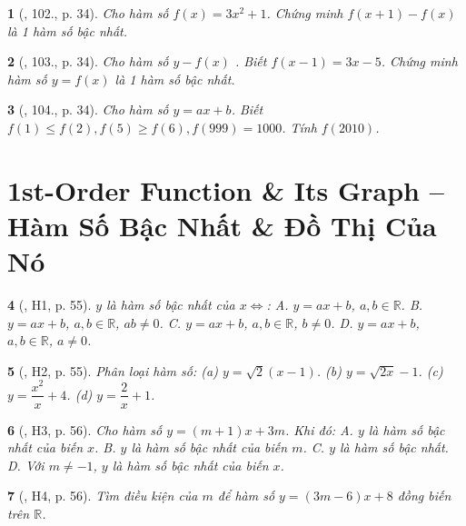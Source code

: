 \documentclass{article}
\newtheorem{baitoan}{}
\begin{document}
\begin{baitoan}[\cite{Tuyen_Toan_9_old}, 102., p. 34]
	Cho hàm số $f(x) = 3x^2 + 1$. Chứng minh $f(x + 1) - f(x)$ là 1 hàm số bậc nhất.
\end{baitoan}

\begin{baitoan}[\cite{Tuyen_Toan_9_old}, 103., p. 34]
	Cho hàm số $y - f(x)$ . Biết $f(x - 1) = 3x - 5$. Chứng minh hàm số $y = f(x)$ là 1 hàm số bậc nhất.
\end{baitoan}

\begin{baitoan}[\cite{Tuyen_Toan_9_old}, 104., p. 34]
	Cho hàm số $y = ax + b$. Biết $f(1)\le f(2),f(5)\ge f(6),f(999) = 1000$. Tính $f(2010)$.
\end{baitoan}


\section{1st-Order Function \& Its Graph -- Hàm Số Bậc Nhất \& Đồ Thị Của Nó}

\begin{baitoan}[\cite{Binh_boi_duong_Toan_9_tap_1}, H1, p. 55]
	$y$ là hàm số bậc nhất của $x\Leftrightarrow$: {\sf A.} $y = ax + b$, $a,b\in\mathbb{R}$. {\sf B.} $y = ax + b$, $a,b\in\mathbb{R}$, $ab\ne0$. {\sf C.} $y = ax + b$, $a,b\in\mathbb{R}$, $b\ne0$. {\sf D.} $y = ax + b$, $a,b\in\mathbb{R}$, $a\ne0$.
\end{baitoan}

\begin{baitoan}[\cite{Binh_boi_duong_Toan_9_tap_1}, H2, p. 55]
	Phân loại hàm số: (a) $y = \sqrt{2}(x - 1)$. (b) $y = \sqrt{2x} - 1$. (c) $y = \dfrac{x^2}{x} + 4$. (d) $y = \dfrac{2}{x} + 1$.
\end{baitoan}

\begin{baitoan}[\cite{Binh_boi_duong_Toan_9_tap_1}, H3, p. 56]
	Cho hàm số $y = (m + 1)x + 3m$. Khi đó: {\sf A.} $y$ là hàm số bậc nhất của biến $x$. {\sf B.} $y$ là hàm số bậc nhất của biến $m$. {\sf C.} $y$ là hàm số bậc nhất. {\sf D.} Với $m\ne-1$, $y$ là hàm số bậc nhất của biến $x$.
\end{baitoan}

\begin{baitoan}[\cite{Binh_boi_duong_Toan_9_tap_1}, H4, p. 56]
	Tìm điều kiện của $m$ để hàm số $y = (3m - 6)x + 8$ đồng biến trên $\mathbb{R}$.
\end{baitoan}
\end{document}
